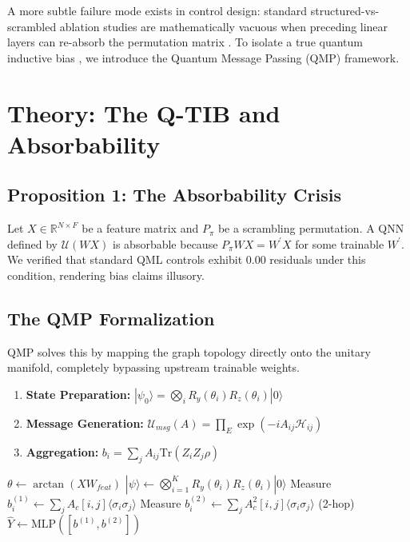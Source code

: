 \documentclass[aps,prxquantum,twocolumn,superscriptaddress]{revtex4-2}
\begin{document}
A more subtle failure mode exists in control design: standard structured-vs-scrambled ablation studies are mathematically vacuous when preceding linear layers can re-absorb the permutation matrix \cite{schatzki2024}. To isolate a true quantum inductive bias \cite{thabet2026}, we introduce the Quantum Message Passing (QMP) framework.

\section{Theory: The Q-TIB and Absorbability}

\subsection{Proposition 1: The Absorbability Crisis}
Let $X \in \mathbb{R}^{N \times F}$ be a feature matrix and $P_\pi$ be a scrambling permutation. A QNN defined by $\mathcal{U}(W X)$ is absorbable because $P_\pi W X = W^\prime X$ for some trainable $W^\prime$. We verified that standard QML controls exhibit $0.00$ residuals under this condition, rendering bias claims illusory.

\subsection{The QMP Formalization}
QMP solves this by mapping the graph topology directly onto the unitary manifold, completely bypassing upstream trainable weights.
\begin{enumerate}
    \item \textbf{State Preparation:} $|\psi_0\rangle = \bigotimes_i R_y(\theta_i) R_z(\theta_i) |0\rangle$
    \item \textbf{Message Generation:} $\mathcal{U}_{msg}(A) = \prod_{E} \exp(-i A_{ij} \mathcal{H}_{ij})$
    \item \textbf{Aggregation:} $b_i = \sum_j A_{ij} \mathrm{Tr}(Z_i Z_j \rho)$
\end{enumerate}

\begin{algorithm}
\caption{QMP Forward Pass}\label{alg:qmp}
\SetAlgoLined
{}
 $\theta \gets \arctan(X W_{feat})$\;
 $|\psi\rangle \gets \bigotimes_{i=1}^K R_y(\theta_i) R_z(\theta_i) |0\rangle$\;
 Measure $b_i^{(1)} \gets \sum_j A_c[i,j] \langle \sigma_i \sigma_j \rangle$\;
 Measure $b_i^{(2)} \gets \sum_j A_c^2[i,j] \langle \sigma_i \sigma_j \rangle$ (2-hop)\;
 $\hat{Y} \gets \text{MLP}([b^{(1)}, b^{(2)}])$\;
\end{algorithm}
\end{document}
